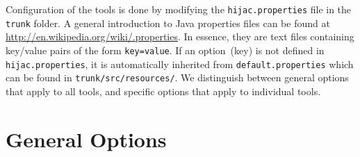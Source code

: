 \documentclass{report}
\begin{document}
Configuration of the tools is done by modifying the \verb"hijac.properties" file in the \verb"trunk" folder. A general introduction to Java properties files can be found at \url{http://en.wikipedia.org/wiki/.properties}. In essence, they are text files containing key/value pairs of the form \verb"key=value". If an option~(key) is not defined in \verb"hijac.properties", it is automatically inherited from \verb"default.properties" which can be found in \verb"trunk/src/resources/". We distinguish between general options that apply to all tools, and specific options that apply to individual tools.

\section{General Options}
\end{document}
